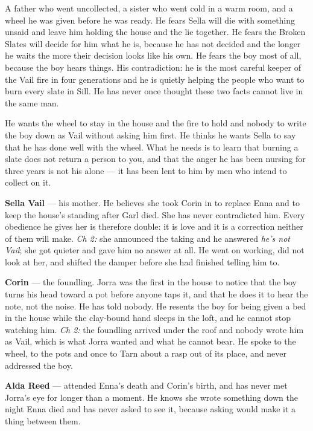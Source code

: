 \documentclass{design/chronicle}
\begin{document}
{
A father who went uncollected, a sister who went cold in a warm room, and a wheel he was given before he was ready. He fears Sella will die with something unsaid and leave him holding the house and the lie together. He fears the Broken Slates will decide for him what he is, because he has not decided and the longer he waits the more their decision looks like his own. He fears the boy most of all, because the boy hears things. His contradiction: he is the most careful keeper of the Vail fire in four generations and he is quietly helping the people who want to burn every slate in Sill. He has never once thought these two facts cannot live in the same man.

He wants the wheel to stay in the house and the fire to hold and nobody to write the boy down as Vail without asking him first. He thinks he wants Sella to say that he has done well with the wheel. What he needs is to learn that burning a slate does not return a person to you, and that the anger he has been nursing for three years is not his alone — it has been lent to him by men who intend to collect on it.

\textbf{Sella Vail} — his mother. He believes she took Corin in to replace Enna and to keep the house’s standing after Garl died. She has never contradicted him. Every obedience he gives her is therefore double: it is love and it is a correction neither of them will make. \emph{Ch 2:} she announced the taking and he answered \emph{he’s not Vail}; she got quieter and gave him no answer at all. He went on working, did not look at her, and shifted the damper before she had finished telling him to.

\textbf{Corin} — the foundling. Jorra was the first in the house to notice that the boy turns his head toward a pot before anyone taps it, and that he does it to hear the note, not the noise. He has told nobody. He resents the boy for being given a bed in the house while the clay-bound hand sleeps in the loft, and he cannot stop watching him. \emph{Ch 2:} the foundling arrived under the roof and nobody wrote him as Vail, which is what Jorra wanted and what he cannot bear. He spoke to the wheel, to the pots and once to Tarn about a rasp out of its place, and never addressed the boy.

\textbf{Alda Reed} — attended Enna’s death and Corin’s birth, and has never met Jorra’s eye for longer than a moment. He knows she wrote something down the night Enna died and has never asked to see it, because asking would make it a thing between them.

}
\end{document}
